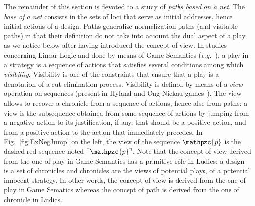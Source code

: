 \documentclass{LMCS}
\def\eg{{\em e.g.}}
\newcommand{\design}[1]{{\mathfrak{#1}}}
\newcommand{\pathLL}[1]{\mathpzc{#1}}\newcommand{\strategy}[1]{\pathLL{#1}}\newcommand{\view}[1]{\raisebox{.3ex}{$\ulcorner$}{#1}\raisebox{.3ex}{$\urcorner$}}\newcommand{\fullview}[1]{\raisebox{.3ex}{$\ulcorner\mkern-6mu\ulcorner\mkern-2mu$}{#1}\raisebox{.3ex}{$\mkern-2mu\urcorner\mkern-6mu\urcorner$}}\newcommand{\views}[1]{\view{#1}}\newcommand{\fullviews}[1]{\fullview{#1}}\newcommand{\shuffle}[1]{\llcorner\design{#1}\lrcorner}\newcommand{\PoD}[1]{{\mathcal{P}}_{#1}}\newcommand{\norm}[1]{\llbracket\design{#1}\rrbracket}
\begin{document}
The remainder of this section is devoted to a study of {\em paths based on a net}. The {\em base of a net} consists in the sets of loci that serve as initial addresses, hence initial actions of a design. Paths generalize normalization paths (and visitable paths) in that their definition do not take into account the dual aspect of a play as we notice below after having introduced the concept of view. In studies concerning Linear Logic and done by means of Game Semantics (\eg\ \cite{DBLP:conf/csl/FaggianH02,Laurent05a}), a play in a strategy is a sequence of actions that satisfies several conditions among which {\em visibility}. Visibility is one of the constraints that ensure that a play is a denotation of a cut-elimination process.
Visibility is defined by means of a {\em view} operation on sequences (present in Hyland and Ong-Nickau games~\cite{HylandOng93,DBLP:conf/lfcs/Nickau94}).   
The view allows to recover a chronicle from a sequence of actions, hence also from paths: a view is the subsequence obtained from some sequence of actions by jumping from a negative action to its justification, if any, that should be a positive action, and from a positive action to the action that immediately precedes.
In Fig.~\ref{fig:ExNegJump} on the left, the view of the sequence $\pathLL{p}$ is the dashed red sequence noted $\view{\pathLL{p}}$. Note that the concept of view derived from the one of play in Game Semantics has a primitive r\^ole in Ludics: a design is a set of chronicles and chronicles are the views of potential plays, of a potential innocent strategy. In other words, the concept of view is derived from the one of play in Game Sematics whereas the concept of path is derived from the one of chronicle in Ludics.
 
\end{document}
